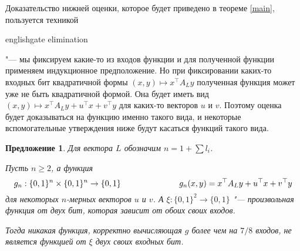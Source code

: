 \documentclass[oneside, a4paper]{article}
\newtheorem{proposition}{Предложение}
\theoremstyle{definition}
\theoremstyle{remark}
\begin{document}
Доказательство нижней оценки, которое будет приведено в теореме
\ref{main}, пользуется техникой \begin{foreignlanguage}{english}gate
elimination\end{foreignlanguage} "--- мы фиксируем какие-то из входов функции
и для полученной функции применяем индукционное предположение. Но при
фиксировании каких-то входных бит квадратичной формы $(x, y) \mapsto x^\top A_L
y$ полученная функция может уже не быть квадратичной формой. Она будет иметь
вид $(x, y) \mapsto x^\top A_L y + u^\top x + v^\top y$ для каких-то векторов
$u$ и $v$. Поэтому оценка будет доказываться на функцию именно такого вида, и
некоторые вспомогательные утверждения ниже будут касаться функций такого вида.

\begin{proposition} \label{tough}
Для вектора $L$ обозначим $n = 1 + \sum l_i$.

Пусть $n \geq 2$, а функция
\[
g_n : \{0, 1\}^n \times \{0, 1\}^n \to \{0, 1\} \hspace{2.5cm}
g_n(x, y) = x^\top A_L y + u^\top x + v^\top y
\]
для некоторых $n$-мерных векторов $u$ и $v$. А $\xi : \{0, 1\}^2 \to \{0, 1\}$
"--- произвольная функция от двух бит, которая зависит от обоих своих входов.

Тогда никакая функция, корректно вычисляющая $g$ более чем на $7/8$ входов, не
является функцией от $\xi$ двух своих входных бит.
\end{proposition}
\end{document}
